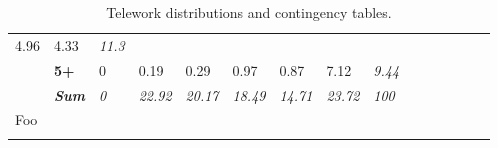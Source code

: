 {\begin{center}
\begin{longtable}{lllllllllllllll}
  \cellcolor[HTML]{DEDEDE}4.96 &
  \cellcolor[HTML]{E3E3E3}4.33 &
  \textit{11.3} &
   &
   &
   &
   &
   &
  \textit{} \\
 &
  \textbf{5+} &
  \cellcolor[HTML]{FFFFFF}0 &
  \cellcolor[HTML]{FEFEFE}0.19 &
  \cellcolor[HTML]{FEFEFE}0.29 &
  \cellcolor[HTML]{F9F9F9}0.97 &
  \cellcolor[HTML]{FAFAFA}0.87 &
  \cellcolor[HTML]{D0D0D0}7.12 &
  \textit{9.44} &
   &
   &
   &
   &
   &
  \textit{} \\
\textit{} &
  \textit{\textbf{Sum}} &
  \textit{0} &
  \textit{22.92} &
  \textit{20.17} &
  \textit{18.49} &
  \textit{14.71} &
  \textit{23.72} &
  \textit{100} &
  \textit{} &
  \textit{} &
  \textit{} &
  \textit{} &
  \textit{} &
  \textit{} \\
  \bottomrule
\multicolumn{15}{l}{Foo}\\
\caption{\label{tab:wfh-table-weighted-combined} Telework distributions and contingency tables.}
\end{longtable}
\end{center}
}
